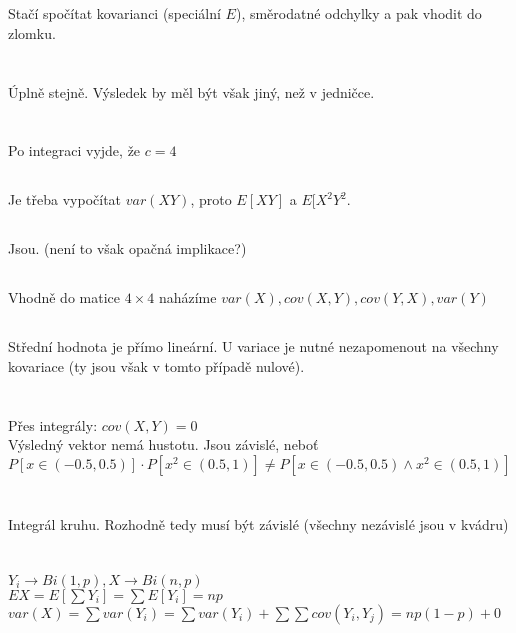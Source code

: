 \documentclass[a4paper]{article}
\begin{document}
\thispagestyle{fancy} %
{}

\section{}
Stačí spočítat kovarianci (speciální $E$), směrodatné odchylky a pak vhodit do zlomku.

\section{}
Úplně stejně. Výsledek by měl být však jiný, než v jedničce.

\section{}
\subsection{}
Po integraci vyjde, že $c=4$
\subsection{}
Je třeba vypočítat $var(XY)$, proto $E[XY]$ a $E[X^2Y^2$.
\subsection{}
Jsou. (není to však opačná implikace?)
\subsection{}
Vhodně do matice $4\times 4$ naházíme $var(X), cov(X,Y), cov(Y, X), var(Y)$
\subsection{}
Střední hodnota je přímo lineární. U variace je nutné nezapomenout na všechny kovariace (ty jsou však v tomto případě nulové).

\section{}
Přes integrály: $cov(X,Y) = 0$\\
Výsledný vektor nemá hustotu. Jsou závislé, neboť $P[x \in (-0.5, 0.5)] \cdot P[x^2 \in (0.5, 1)] \ne P[x \in (-0.5, 0.5) \wedge x^2 \in (0.5, 1)]$

\section{}
Integrál kruhu. Rozhodně tedy musí být závislé (všechny nezávislé jsou v kvádru)

\section{}
$Y_i \rightarrow Bi(1, p), X \rightarrow Bi(n, p)$\\
$ EX = E[\sum Y_i] = \sum E[Y_i] = np$ \\
$var(X) = \sum var(Y_i) = \sum var(Y_i) + \sum \sum cov(Y_i, Y_j) = np(1-p) + 0$
\end{document}
